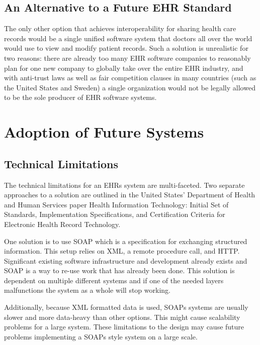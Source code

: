 \documentclass[14pt]{article}
\begin{document}
\subsection{An Alternative to a Future EHR Standard}
\label{sec:TechnicalStandardsAlternative}
The only other option that achieves interoperability for sharing health care records would be a single unified software system that doctors all over the world would use to view and modify patient records. Such a solution is unrealistic for two reasons: there are already too many \gls{EHR} software companies to reasonably plan for one new company to globally take over the entire \gls{EHR} industry, and with anti-trust laws as well as fair competition clauses in many countries (such as the United States and Sweden) a single organization would not be legally allowed to be the sole producer of \gls{EHR} software systems.

\newpage

\section{Adoption of Future Systems}
\label{sec:Future}

\subsection{Technical Limitations}
\label{sec:futureTechnical}
The technical limitations for an \glspl{EHR} system are multi-faceted. Two separate approaches to a solution are outlined in the United States’ Department of Health and Human Services paper Health Information Technology: Initial Set of Standards, Implementation Specifications, and Certification Criteria for Electronic Health Record Technology. \cite{AMA} 

One solution is to use \gls{SOAP} which is a specification for exchanging structured information. This setup relies on \gls{XML}, a remote procedure call, and \gls{HTTP}. Significant existing software infrastructure and development already exists and SOAP is a way to re-use work that has already been done. This solution is dependent on multiple different systems and if one of the needed layers malfunctions the system as a whole will stop working. 

Additionally, because \gls{XML} formatted data is used, \glspl{SOAP} systems are usually slower and more data-heavy than other options. This might cause scalability problems for a large system. These limitations to the design may cause future problems implementing a \glspl{SOAP} style system on a large scale.
\end{document}
